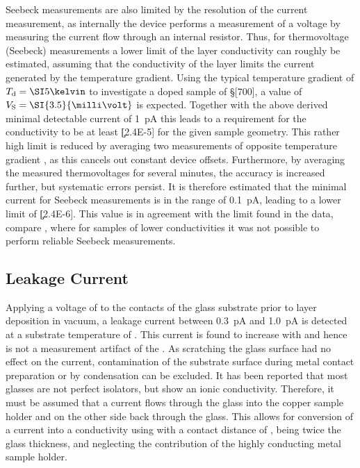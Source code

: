 Seebeck measurements are also limited by the resolution of the current measurement, as internally the device performs a measurement of a voltage by measuring the current flow through an internal resistor.
Thus, for thermovoltage \Vs (Seebeck) measurements a lower limit of the layer conductivity can roughly be estimated, assuming that the conductivity of the layer limits the current generated by the temperature gradient.
Using the typical temperature gradient of $\Td=\K{5}$ to investigate a doped sample of \S[700], a value of $\Vs=\SI{3.5}{\milli\volt}$ is expected. Together with the above derived minimal detectable current of \SI{1}{\pico\ampere} this leads to a requirement for the conductivity to be at least \c[2.4E-5] for the given sample geometry.
This rather high limit is reduced by averaging two measurements of opposite temperature gradient \Td, as this cancels out constant device offsets. Furthermore, by averaging the measured thermovoltages for several minutes, the accuracy is increased further, but systematic errors persist. It is therefore estimated that the minimal current for Seebeck measurements is in the range of \SI{0.1}{\pico\ampere}, leading to a lower limit of \c[2.4E-6]. This value is in agreement with the limit found in the data, compare , where for samples of lower conductivities it was not possible to perform reliable Seebeck measurements.

\subsection{Leakage Current}\label{sec:ExpLeakageCurrent}
Applying a voltage of \V[10] to the contacts of the glass substrate prior to layer deposition in vacuum, a leakage current between \SI{0.3}{\pico\ampere} and \SI{1.0}{\pico\ampere} is detected at a substrate temperature of \Tsub[25]. This current is found to increase with \Tsub and hence is not a measurement artifact of the \SMU.
As scratching the glass surface had no effect on the current, contamination of the substrate surface during metal contact preparation or by condensation can be excluded. It has been reported that most glasses are not perfect isolators, but show an ionic conductivity\cite{Ingram1989}. Therefore, it must be assumed that a current flows through the glass into the copper sample holder and on the other side back through the glass. This allows for conversion of a current into a conductivity using  with a contact distance of , being twice the glass thickness, and neglecting the contribution of the highly conducting metal sample holder.


